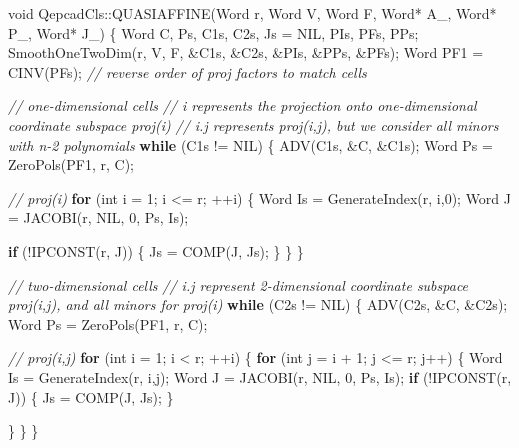 \documentclass[
]{book}
\newenvironment{Shaded}{\begin{snugshade}}{\end{snugshade}}
\newcommand{\CommentTok}[1]{\textcolor[rgb]{0.56,0.35,0.01}{\textit{#1}}}
\newcommand{\ControlFlowTok}[1]{\textcolor[rgb]{0.13,0.29,0.53}{\textbf{#1}}}
\newcommand{\DataTypeTok}[1]{\textcolor[rgb]{0.13,0.29,0.53}{#1}}
\newcommand{\DecValTok}[1]{\textcolor[rgb]{0.00,0.00,0.81}{#1}}
\newcommand{\NormalTok}[1]{#1}
\theoremstyle{definition}
\theoremstyle{definition}
\theoremstyle{definition}
\theoremstyle{definition}
\theoremstyle{remark}
\begin{document}
\begin{Shaded}
\begin{Highlighting}[numbers=left,,]
\DataTypeTok{void}\NormalTok{ QepcadCls::QUASIAFFINE(Word r, Word V, Word F, Word* A\_, Word* P\_, Word* J\_)}
\NormalTok{\{}
\NormalTok{    Word C, Ps, C1s, C2s, Js = NIL, PIs, PFs, PPs;}
\NormalTok{    SmoothOneTwoDim(r, V, F, \&C1s, \&C2s, \&PIs, \&PPs, \&PFs);}
\NormalTok{    Word PF1 = CINV(PFs); }\CommentTok{// reverse order of proj factors to match cells}

    \CommentTok{// one{-}dimensional cells}
    \CommentTok{// i represents the projection onto one{-}dimensional coordinate subspace proj(i)}
    \CommentTok{// i.j represents proj(i,j), but we consider all minors with n{-}2 polynomials}
    \ControlFlowTok{while}\NormalTok{ (C1s != NIL) \{}
\NormalTok{        ADV(C1s, \&C, \&C1s);}
\NormalTok{        Word Ps = ZeroPols(PF1, r, C);}

        \CommentTok{// proj(i)}
        \ControlFlowTok{for}\NormalTok{ (}\DataTypeTok{int}\NormalTok{ i = }\DecValTok{1}\NormalTok{; i \textless{}= r; ++i) \{}
\NormalTok{            Word Is = GenerateIndex(r, i,}\DecValTok{0}\NormalTok{);}
\NormalTok{            Word J = JACOBI(r, NIL, }\DecValTok{0}\NormalTok{, Ps, Is);}

            \ControlFlowTok{if}\NormalTok{ (!IPCONST(r, J)) \{}
\NormalTok{                Js = COMP(J, Js);}
\NormalTok{            \}}
\NormalTok{        \}}
\NormalTok{    \}}

    \CommentTok{// two{-}dimensional cells}
    \CommentTok{// i.j represent 2{-}dimensional coordinate subspace proj(i,j), and all minors for proj(i)}
    \ControlFlowTok{while}\NormalTok{ (C2s != NIL) \{}
\NormalTok{        ADV(C2s, \&C, \&C2s);}
\NormalTok{        Word Ps = ZeroPols(PF1, r, C);}

        \CommentTok{// proj(i,j)}
        \ControlFlowTok{for}\NormalTok{ (}\DataTypeTok{int}\NormalTok{ i = }\DecValTok{1}\NormalTok{; i \textless{} r; ++i) \{}
            \ControlFlowTok{for}\NormalTok{ (}\DataTypeTok{int}\NormalTok{ j = i + }\DecValTok{1}\NormalTok{; j \textless{}= r; j++) \{}
\NormalTok{                Word Is = GenerateIndex(r, i,j);}
\NormalTok{                Word J = JACOBI(r, NIL, }\DecValTok{0}\NormalTok{, Ps, Is);}
                \ControlFlowTok{if}\NormalTok{ (!IPCONST(r, J)) \{}
\NormalTok{                    Js = COMP(J, Js);}
\NormalTok{                \}}

\NormalTok{            \}}
\NormalTok{        \}}
\NormalTok{    \}}


\end{Highlighting}
\end{Shaded}
\end{document}
